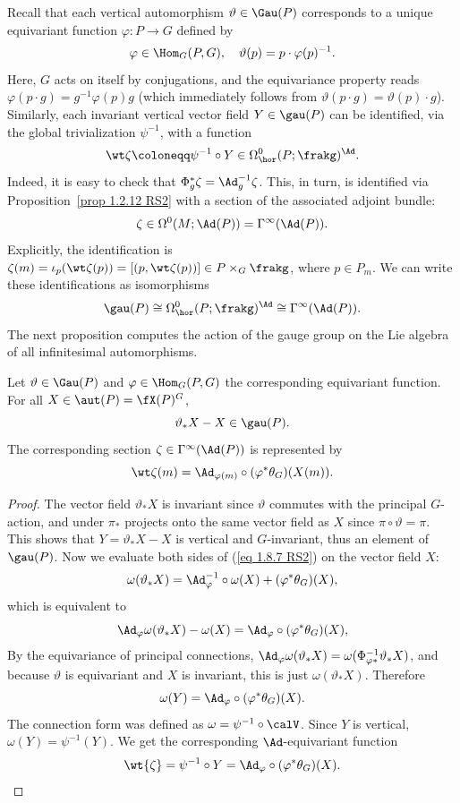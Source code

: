 Recall that each vertical automorphism $\vartheta\in \Gau(P)$ corresponds to a unique equivariant function $\varphi:P\to G$ defined by 
\[\varphi\in \Hom_G(P,G),\quad \vartheta(p)=p\cdot \varphi(p)^{-1}.\]
Here, $G$ acts on itself by conjugations, and the equivariance property reads $\varphi(p\cdot g)=g^{-1}\varphi(p)g$ (which immediately follows from $\vartheta(p\cdot g)=\vartheta(p)\cdot g$). Similarly, each invariant vertical vector field $Y\in \gau(P)$ can be identified, via the global trivialization $\psi^{-1}$, with a function 
\[\wt\zeta\coloneqq \psi^{-1}\circ Y\in \Omega^0_{\hor}(P;\frakg)^\Ad.\]
Indeed, it is easy to check that $\Phi_g^\ast \zeta=\Ad_g^{-1}\zeta$. This, in turn, is identified via Proposition~\ref{prop 1.2.12 RS2} with a section of the associated adjoint bundle:
\[\zeta\in \Omega^0(M;\Ad(P))=\Gamma^\infty(\Ad(P)).\]
Explicitly, the identification is $\zeta(m)=\iota_p(\wt\zeta(p))=[(p,\wt\zeta(p))]\in P\times_G \frakg$, where $p\in P_m$.
We can write these identifications as isomorphisms
\[\gau(P)\cong \Omega^0_{\hor}(P;\frakg)^\Ad\cong \Gamma^\infty(\Ad(P)).\]
The next proposition computes the action of the gauge group on the Lie algebra of all infinitesimal automorphisms.

\begin{prop}
    Let $\vartheta\in\Gau(P)$ and $\varphi\in \Hom_G(P,G)$ the corresponding equivariant function. For all $X\in\aut(P)=\fX(P)^G$,
    \[\vartheta_\ast X-X\in\gau(P).\]
    The corresponding section $\zeta \in\Gamma^\infty(\Ad(P))$ is represented by
    \[\wt\zeta(m)=\Ad_{\varphi(m)}\circ(\varphi^\ast \theta_G)(X(m)).\]
\end{prop}
\begin{proof}
    The vector field $\vartheta_\ast X$ is invariant since $\vartheta$ commutes with the principal $G$-action, and under $\pi_\ast$ projects onto the same vector field as $X$ since $\pi\circ\vartheta=\pi$. This shows that $Y=\vartheta_\ast X-X$ is vertical and $G$-invariant, thus an element of $\gau(P)$. Now we evaluate both sides of (\ref{eq 1.8.7 RS2}) on the vector field $X$:
    \[\omega(\vartheta_\ast X)=\Ad_{\varphi}^{-1}\circ \omega(X)+(\varphi^\ast \theta_G)(X),\]
    which is equivalent to
    \[\Ad_\varphi\omega(\vartheta_\ast X)-\omega(X)=\Ad_\varphi\circ (\varphi^\ast \theta_G)(X),\]
    By the equivariance of principal connections, $\Ad_\varphi\omega(\vartheta_\ast X)=\omega(\Phi_{\varphi\ast}^{-1}\vartheta_\ast X)$, and because $\vartheta$ is equivariant and $X$ is invariant, this is just $\omega(\vartheta_\ast X)$. Therefore
    \[\omega(Y)=\Ad_\varphi\circ (\varphi^\ast \theta_G)(X).\]
    The connection form was defined as $\omega=\psi^{-1}\circ\calV$. Since $Y$ is vertical, $\omega(Y)=\psi^{-1}(Y)$. We get the corresponding $\Ad$-equivariant function
    \[\wt{\zeta}=\psi^{-1}\circ Y=\Ad_\varphi\circ (\varphi^\ast\theta_G)(X).\]
\end{proof}

